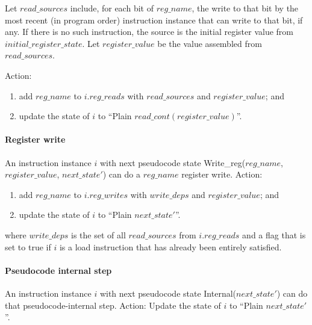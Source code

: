 Let $read\_sources$ include, for each bit of $reg\_name$, the write to that bit by the most recent (in program order) instruction instance that can write to that bit, if any. If there is no such instruction, the source is the initial register value from $initial\_register\_state$.
Let  $register\_value$ be the value assembled from $read\_sources$.

Action:
\begin{enumerate}
\item add $reg\_name$ to $i.reg\_reads$ with $read\_sources$ and $register\_value$; and
\item update the state of $i$ to ``{\sc Plain} $read\_cont(register\_value)$''.
\end{enumerate}


\paragraph{Register write}\label{omm:thread:reg_write}
An instruction instance $i$ with next pseudocode state {\sc Write\_reg}($reg\_name$, $register\_value$, $next\_state'$) can do a $reg\_name$ register write.
Action:
\begin{enumerate}
\item add $reg\_name$ to $i.reg\_writes$ with $write\_deps$ and $register\_value$; and
\item update the state of $i$ to ``{\sc Plain} $next\_state'$''.
\end{enumerate}
where $write\_deps$ is the set of all $read\_sources$ from $i.reg\_reads$ and a flag that is set to true if $i$ is a load instruction that has already been entirely satisfied.


\paragraph{Pseudocode internal step}\label{omm:thread:sail_interp}
An instruction instance $i$ with next pseudocode state {\sc Internal}($next\_state'$) can do that pseudocode-internal step.
Action: Update the state of $i$ to ``{\sc Plain} $next\_state'$''.


